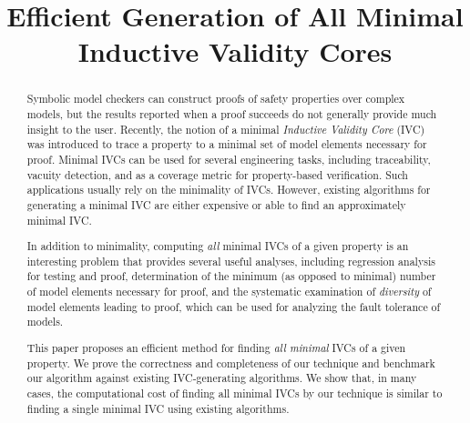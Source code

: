 \documentclass{llncs}
\begin{document}
\newcommand{\mike}[1]{\textcolor{red}{#1}}
\newcommand{\fixed}[1]{\textcolor{purple}{#1}}
\newcommand{\andrew}[1]{\textcolor{green}{#1}}
\newcommand{\ela}[1]{\textcolor{blue}{#1}}
\newcommand{\stateequiv}{\equiv_{s}}
\newcommand{\traceequiv}{\equiv_{\sigma}}
\newcommand{\ta}{\text{TA}}
\newcommand{\cta}{\text{TA$_{C}$}}
\newcommand{\tta}{\text{TA$_{T}$}}
\newcommand{\ucalg}{\texttt{\small{IVC\_UC}}}
\newcommand{\ucbfalg}{\texttt{\small{IVC\_UCBF}}}


\title{Efficient Generation of All Minimal Inductive Validity Cores}
%
\maketitle

\begin{abstract}
Symbolic model checkers can construct proofs of safety properties over complex models, but the results reported when a proof succeeds do not generally provide much insight to the user.  Recently, the notion of a minimal {\em Inductive Validity Core} (IVC) was introduced to trace a property to a minimal set of model elements necessary for proof.  Minimal IVCs can be used for several engineering tasks, including traceability, vacuity detection, and as a coverage metric for property-based verification. Such applications usually rely on the minimality of IVCs. However, existing algorithms for generating a minimal IVC are either expensive or able to find an approximately
minimal IVC.

In addition to minimality, computing \emph{all} minimal IVCs of a given
property is an interesting problem that provides several useful analyses, including regression analysis for testing and proof, determination of the minimum (as opposed to minimal) number of model elements necessary for proof, and the systematic examination of {\em diversity} of model elements leading to proof, which can be used for analyzing the fault tolerance of models.

This paper proposes an efficient method for finding {\em all minimal} IVCs of a given property. We prove the correctness and completeness of our technique and benchmark our algorithm against existing IVC-generating algorithms.  We show that, in many cases, the computational cost of finding all minimal IVCs by our technique is similar to finding a single minimal IVC using existing algorithms.
\end{abstract}
\end{document}
